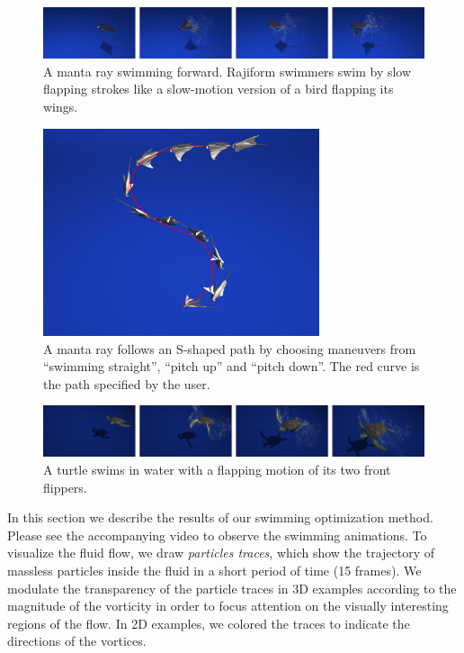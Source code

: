 \begin{figure}[ht]
\centering
\includegraphics[width=\textwidth]{figures/manta.eps}
\caption{A manta ray swimming forward. Rajiform swimmers swim by slow flapping strokes like a slow-motion version of a bird flapping its wings.}
\label{fig:manta}
\end{figure}

\begin{figure}[!b]
\centering
\includegraphics[width=3.2in]{figures/manta_path2.eps}
\caption{A manta ray follows an S-shaped path by choosing maneuvers from ``swimming straight'', ``pitch up'' and ``pitch down''. The red curve is the path specified by the user.}
\label{fig:manta_path}
\end{figure}

\begin{figure}[ht]
\centering
\includegraphics[width=\textwidth]{figures/turtle.eps}
\caption{A turtle swims in water with a flapping motion of its two front flippers. }
\label{fig:turtle}
\end{figure}

In this section we describe the results of our swimming optimization
method.  Please see the accompanying video to observe the swimming
animations.  To visualize the fluid flow, we draw \emph{particles traces},
which show the trajectory of massless particles inside the fluid in a
short period of time (15 frames). We modulate the transparency of the
particle traces in 3D examples according to the magnitude of the vorticity
in order to focus attention on the visually interesting regions of the
flow.  In 2D examples, we colored the traces to indicate the directions of
the vortices.




